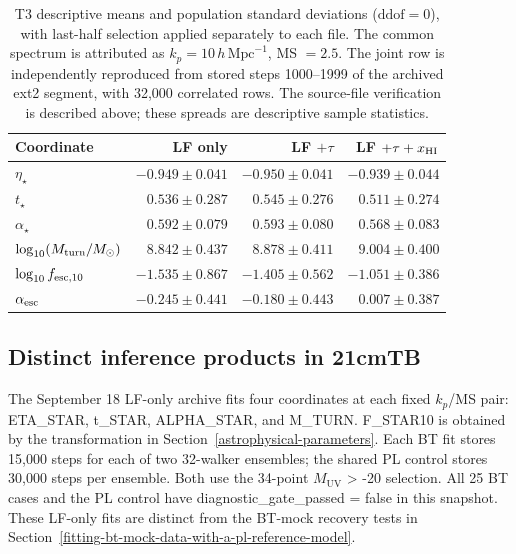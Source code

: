 \begin{table}[t]\centering\small
\caption{T3 descriptive means and population standard deviations ($\mathrm{ddof}=0$), with last-half selection applied separately to each file. The common spectrum is attributed as $k_p=10\,h\,\mathrm{Mpc}^{-1}$, MS $=2.5$. The joint row is independently reproduced from stored steps 1000--1999 of the archived ext2 segment, with 32,000 correlated rows. The source-file verification is described above; these spreads are descriptive sample statistics.}\label{tab:t3-obs-combinations}
\begin{tabular*}{\textwidth}{@{\extracolsep{\fill}}lrrr}\toprule
Coordinate & LF only & LF $+\tau$ & LF $+\tau+x_{\rm HI}$\\\midrule
$\eta_\star$ & $-0.949\pm0.041$ & $-0.950\pm0.041$ & $-0.939\pm0.044$\\
$t_\star$ & $0.536\pm0.287$ & $0.545\pm0.276$ & $0.511\pm0.274$\\
$\alpha_\star$ & $0.592\pm0.079$ & $0.593\pm0.080$ & $0.568\pm0.083$\\
$\log_{10}(M_{\rm turn}/M_\odot)$ & $8.842\pm0.437$ & $8.878\pm0.411$ & $9.004\pm0.400$\\
$\log_{10}f_{{\rm esc},10}$ & $-1.535\pm0.867$ & $-1.405\pm0.562$ & $-1.051\pm0.386$\\
$\alpha_{\rm esc}$ & $-0.245\pm0.441$ & $-0.180\pm0.443$ & $0.007\pm0.387$\\
\bottomrule\end{tabular*}\end{table}

\subsection{Distinct inference products in 21cmTB}\label{distinct-inference-products-in-21cmtb}

The September 18 LF-only archive fits four coordinates at each fixed \ensuremath{k_p}/MS pair: ETA\_STAR, t\_STAR, ALPHA\_STAR, and M\_TURN. F\_STAR10 is obtained by the transformation in Section~\ref{astrophysical-parameters}. Each BT fit stores 15,000 steps for each of two 32-walker ensembles; the shared PL control stores 30,000 steps per ensemble. Both use the 34-point \ensuremath{M_{\mathrm{UV}}} \textgreater{} -20 selection. All 25 BT cases and the PL control have diagnostic\_gate\_passed = false in this snapshot. These LF-only fits are distinct from the BT-mock recovery tests in Section~\ref{fitting-bt-mock-data-with-a-pl-reference-model}.

